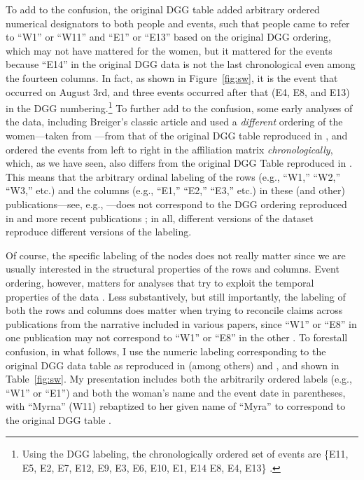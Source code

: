 \documentclass[a4paper,fleqn]{cas-sc}
\begin{document}
To add to the confusion, the original DGG table added arbitrary ordered numerical designators to both people and events, such that people came to refer to ``W1'' or ``W11'' and ``E1'' or ``E13'' based on the original DGG ordering, which may not have mattered for the women, but it mattered for the events because ``E14'' in the original DGG data is not the last chronological even among the fourteen columns. In fact, as shown in Figure~\ref{fig:sw}, it is the event that occurred on August 3rd, and three events occurred after that (E4, E8, and E13) in the DGG numbering.\footnote{Using the DGG labeling, the chronologically ordered set of events are \{E11, E5, E2, E7, E12, E9, E3, E6, E10, E1, E14 E8, E4, E13\} \citep[p. 68]{everett2018measuring}.} To further add to the confusion, some early analyses of the data, including Breiger's \citeyearpar{breiger1974duality} classic article and \citet{doreian1979evolution} used a \textit{different} ordering of the women---taken from \citet[83]{homans1950human}---from that of the original DGG table reproduced in \citet{freeman2003finding}, and ordered the events from left to right in the affiliation matrix \textit{chronologically}, which, as we have seen, also differs from the original DGG Table reproduced in \citet{freeman2003finding}. This means that the arbitrary ordinal labeling of the rows (e.g., ``W1,'' ``W2,'' ``W3,'' etc.) and the columns (e.g., ``E1,'' ``E2,'' ``E3,'' etc.) in these (and other) publications---see, e.g., \citep[table 1]{doreian1979evolution}---does not correspond to the DGG ordering reproduced in \citet{freeman2003finding} and more recent publications \citep[e.g.,][]{borgatti2014analyzing, batagelj2022analysis}; in all, different versions of the dataset reproduce different versions of the labeling. 

Of course, the specific labeling of the nodes does not really matter since we are usually interested in the structural properties of the rows and columns. Event ordering, however, matters for analyses that try to exploit the temporal properties of the data \citep[e.g.,][]{everett2018measuring, lerner2022dynamic}. Less substantively, but still importantly, the labeling of both the rows and columns does matter when trying to reconcile claims across publications from the narrative included in various papers, since ``W1'' or ``E8'' in one publication \citep[e.g.,][]{freeman2003finding} may not correspond to ``W1'' or ``E8'' in the other \citep[e.g.,][]{doreian1979evolution}. To forestall confusion, in what follows, I use the numeric labeling corresponding to the original DGG data table as reproduced in (among others) \citet[Figure 1]{freeman2003finding} and \citet[Figure 28.1]{borgatti2014analyzing}, and shown in Table~\ref{fig:sw}. My presentation includes both the arbitrarily ordered labels (e.g., ``W1'' or ``E1'') and both the woman's name and the event date in parentheses, with ``Myrna'' (W11) rebaptized to her given name of ``Myra'' to correspond to the original DGG table \citep{freeman2003finding, batagelj2022analysis}.
\end{document}
